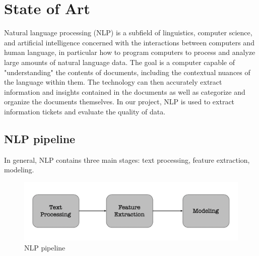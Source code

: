 \documentclass[a4paper,12pt]{report}
\begin{document}
    \chapter{State of Art}
    Natural language processing (NLP) is a subfield of linguistics, computer science, and artificial intelligence concerned with the interactions between computers and human language, in particular how to program computers to process and analyze large amounts of natural language data. The goal is a computer capable of "understanding" the contents of documents, including the contextual nuances of the language within them. The technology can then accurately extract information and insights contained in the documents as well as categorize and organize the documents themselves.
    In our project, NLP is used to extract information tickets and evaluate the quality of data.

    \section{NLP pipeline}
    In general, NLP contains three main stages: text processing, feature extraction, modeling.
    
    \begin{figure}[h]
        \includegraphics[scale=0.18]{nlp_pipeline.png}
        \centering
        \caption{NLP pipeline}
    \end{figure}
\end{document}
